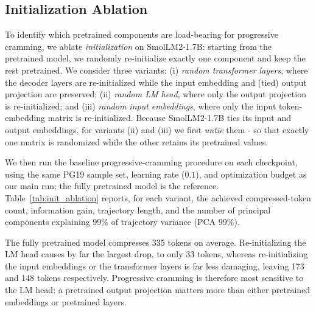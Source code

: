 \subsection{Initialization Ablation}
\label{app:init_ablation}

To identify which pretrained components are load-bearing for progressive cramming, we ablate \emph{initialization} on SmolLM2-1.7B: starting from the pretrained model, we randomly re-initialize exactly one component and keep the rest pretrained. We consider three variants: (i) \emph{random transformer layers}, where the decoder layers are re-initialized while the input embedding and (tied) output projection are preserved; (ii) \emph{random LM head}, where only the output projection is re-initialized; and (iii) \emph{random input embeddings}, where only the input token-embedding matrix is re-initialized. Because SmolLM2-1.7B ties its input and output embeddings, for variants (ii) and (iii) we first \emph{untie} them - so that exactly one matrix is randomized while the other retains its pretrained values.

We then run the baseline progressive-cramming procedure on each checkpoint, using the same PG19 sample set, learning rate ($0.1$), and optimization budget as our main run; the fully pretrained model is the reference. Table~\ref{tab:init_ablation} reports, for each variant, the achieved compressed-token count, information gain, trajectory length, and the number of principal components explaining 99\% of trajectory variance (PCA 99\%).

The fully pretrained model compresses 335 tokens on average. Re-initializing the LM head causes by far the largest drop, to only 33 tokens, whereas re-initializing the input embeddings or the transformer layers is far less damaging, leaving 173 and 148 tokens respectively. Progressive cramming is therefore most sensitive to the LM head: a pretrained output projection matters more than either pretrained embeddings or pretrained layers.

\begin{table}[t]
    \centering
    \caption{Initialization ablation on SmolLM2-1.7B. Exactly one component is randomly re-initialized---transformer layers, LM head, or input embeddings---while the rest stay pretrained; the fully pretrained model is the reference. For the LM-head and input-embedding variants the tied embeddings are first untied so a single matrix is randomized. ``Compressed Tokens'' is the achieved prefix length $n$, ``Trajectory Length'' is $L_{\text{traj}}$, and ``PCA 99\%'' is the number of principal components explaining 99\% of trajectory variance.}
    \label{tab:init_ablation}
    \begin{small}
    
    \end{small}
\vskip -0.1in
\end{table}

